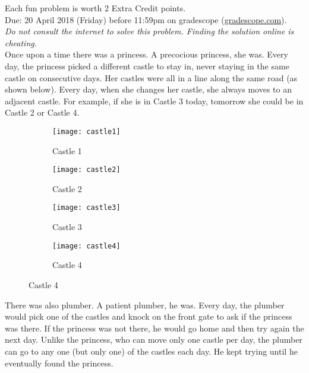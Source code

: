 \documentclass{article}
\theoremstyle{definition}
\begin{document}
\noindent
Each fun problem is worth 2 Extra Credit points.\\
Due: 20 April 2018 (Friday) before 11:59pm on gradescope (\url{gradescope.com}).\\
\textit{Do not consult the internet to solve this problem.  Finding the solution online is cheating.}\\

\noindent
Once upon a time there was a princess.  A precocious princess, she was.  Every day, the princess picked a different castle to stay in, never staying in the same castle on consecutive days.  Her castles were all in a line along the same road (as shown below).  Every day, when she changes her castle, she always moves to an adjacent castle.  For example, if she is in Castle 3 today, tomorrow she could be in Castle 2 or Castle 4.

\begin{figure}[h]
\begin{subfigure}[b]{0.24\textwidth}
\centering
\texttt{[image: castle1]}
\caption{Castle 1}
\end{subfigure}
\begin{subfigure}[b]{0.24\textwidth}
\centering
\texttt{[image: castle2]}
\caption{Castle 2}
\end{subfigure}
\begin{subfigure}[b]{0.24\textwidth}
\centering\texttt{[image: castle3]}
\caption{Castle 3}
\end{subfigure}
\begin{subfigure}[b]{0.24\textwidth}
\centering
\texttt{[image: castle4]}
\caption{Castle 4}
\end{subfigure}
\end{figure}

\noindent
There was also plumber.  A patient plumber, he was.  Every day, the plumber would pick one of the castles and knock on the front gate to ask if the princess was there.  If the princess was not there, he would go home and then try again the next day.  Unlike the princess, who can move only one castle per day, the plumber can go to any one (but only one) of the castles each day.  He kept trying until he eventually found the princess. \\
\end{document}
